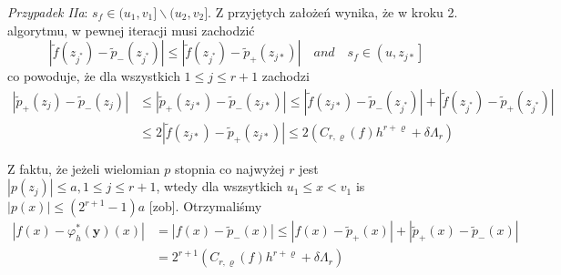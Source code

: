 \documentclass[oik, pdftex, robocza, man]{mgrwms}
\begin{document}
    \textit{Przypadek IIa}: $s_{f} \in (u_{1}, v_{1}] \backslash (u_{2}, v_{2}]$.
    Z przyjętych założeń wynika, że w kroku 2. algorytmu, w pewnej iteracji musi zachodzić
    \begin{equation*}
        \left|\tilde{f}\left(z_{j^{*}}\right)-\tilde{p}_{-\!}\left(z_{j^{*}}\right)\right| \leq\left|\tilde{f}\left(z_{j^{*}}\right)-\tilde{p}_{+\!}\left(z_{j *}\right)\right| \quad and \quad s_{f} \in\left(u, z_{j *}\right]
    \end{equation*}
    co powoduje, że dla wszystkich $1 \leq j \leq r+1$ zachodzi
    \begin{equation*}
        \begin{aligned}
            \left|\tilde{p}_{+}\left(z_{j}\right)-\tilde{p}_{-}\left(z_{j}\right)\right| & 
            \leq\left|\tilde{p}_{+}\left(z_{j *}\right)-\tilde{p}_{-}\left(z_{j *}\right)\right| \leq\left|\tilde{f}\left(z_{j *}\right)-\tilde{p}_{-}\left(z_{j^{*}}\right)\right|+\left|\tilde{f}\left(z_{j^{*}}\right)-\tilde{p}_{+}\left(z_{j^{*}}\right)\right| \\
            & \leq 2\left|\tilde{f}\left(z_{j *}\right)-\tilde{p}_{+}\left(z_{j *}\right)\right| \leq 2\left(C_{r, \varrho}(f) h^{r+\varrho}+\delta \Lambda_{r}\right)
        \end{aligned}
    \end{equation*}
    
    Z faktu, że jeżeli wielomian $p$ stopnia co najwyżej $r$ jest $\left|p\left(z_{j}\right)\right| \leq a, 1 \leq j \leq r+1$, wtedy dla wszsytkich $u_{1} \leq x<v_{1}$ is $|p(x)| \leq\left(2^{r+1}-1\right) a$ [zob]. Otrzymaliśmy
    \begin{equation*}
        \begin{aligned}
            \left|f(x)-\varphi_{h}^{*}(\mathbf{y})(x)\right| &=\left|f(x)-\tilde{p}_{-}(x)\right| \leq\left|f(x)-\tilde{p}_{+}(x)\right|+\left|\tilde{p}_{+}(x)-\tilde{p}_{-}(x)\right| \\
            &=2^{r+1}\left(C_{r, \varrho}(f) h^{r+\varrho}+\delta \Lambda_{r}\right)
        \end{aligned}
    \end{equation*}
\end{document}
